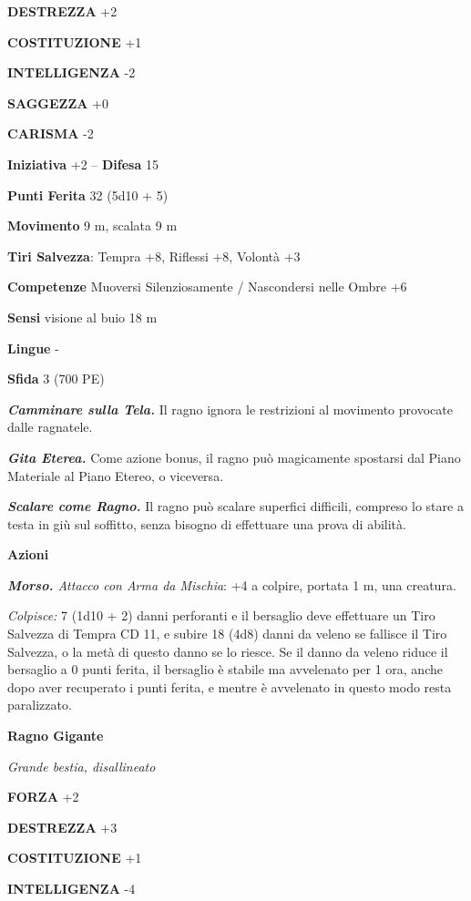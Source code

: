 \begin{multicols}{2}
\textbf{DESTREZZA} +2

\textbf{COSTITUZIONE} +1

\textbf{INTELLIGENZA} -2

\textbf{SAGGEZZA} +0

\textbf{CARISMA} -2

\textbf{Iniziativa} +2 -- \textbf{Difesa} 15

\textbf{Punti Ferita} 32 (5d10 + 5)

\textbf{Movimento} 9 m, scalata 9 m

\textbf{Tiri Salvezza}: Tempra +8, Riflessi +8, Volontà +3 

\textbf{Competenze} Muoversi Silenziosamente / Nascondersi nelle Ombre +6

\textbf{Sensi} visione al buio 18 m

\textbf{Lingue} -

\textbf{Sfida} 3 (700 PE)

\emph{\textbf{Camminare sulla Tela.}} Il ragno ignora le restrizioni al movimento provocate dalle ragnatele.

\emph{\textbf{Gita Eterea.}} Come azione bonus, il ragno può magicamente spostarsi dal Piano Materiale al Piano Etereo, o viceversa.

\emph{\textbf{Scalare come Ragno.}} Il ragno può scalare superfici difficili, compreso lo stare a testa in giù sul soffitto, senza bisogno di effettuare una prova di abilità.

\textbf{Azioni}

\emph{\textbf{Morso.} Attacco con Arma da Mischia}: +4 a colpire, portata 1 m, una creatura.

\emph{Colpisce:} 7 (1d10 + 2) danni perforanti e il bersaglio deve effettuare un Tiro Salvezza di Tempra CD 11, e subire 18 (4d8) danni da veleno se fallisce il Tiro Salvezza, o la metà di questo danno se lo riesce. Se il danno da veleno riduce il bersaglio a 0 punti ferita, il bersaglio è stabile ma avvelenato per 1 ora, anche dopo aver recuperato i punti ferita, e mentre è avvelenato in questo modo resta paralizzato.

\medskip\textbf{Ragno Gigante}

\emph{Grande bestia, disallineato}

\textbf{FORZA} +2

\textbf{DESTREZZA} +3

\textbf{COSTITUZIONE} +1

\textbf{INTELLIGENZA} -4


\end{multicols}
